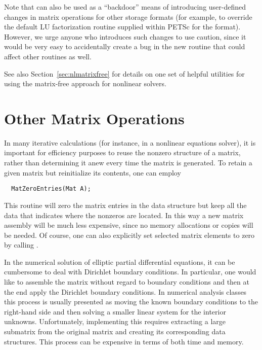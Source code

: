 Note that  can also be used as a
``backdoor'' means of introducing user-defined changes in matrix
operations for other storage formats (for example, to override the
default LU factorization routine supplied within PETSc for the
 format).  However, we urge anyone who introduces such
changes to use caution, since it would be very easy to
accidentally create a bug in the new routine that could affect
other routines as well.

See also Section~\ref{sec:nlmatrixfree} for details on one set of
helpful utilities for using the matrix-free approach for nonlinear
solvers.

\section{Other Matrix Operations}
\label{sec:othermat}

In many iterative calculations (for instance, in a nonlinear equations
solver), it is important for efficiency purposes to reuse the nonzero 
structure of a matrix, rather than determining it anew every time 
the matrix is generated.  To retain a given matrix but reinitialize
its contents, one can employ 
\begin{verbatim}
  MatZeroEntries(Mat A);
\end{verbatim}
This routine will zero the matrix entries in the 
data structure but keep all the data that indicates where the nonzeros
are located.  In this way a new matrix assembly will be much less 
expensive, since no memory allocations or copies will be needed. 
Of course, one can also explicitly set selected matrix elements to zero
by calling .


In the numerical solution of elliptic partial differential equations,
it can be cumbersome to deal with Dirichlet boundary 
 conditions. In
particular, one would like to assemble the matrix without regard to 
boundary conditions and then at the end apply the Dirichlet boundary 
conditions. 
In numerical analysis classes this process is usually presented as moving the 
known boundary conditions to the right-hand side and then solving a smaller
linear system for the interior unknowns. Unfortunately, implementing this
requires extracting a large submatrix from the original matrix and 
creating its corresponding data structures. This process can be expensive 
in terms of both time and memory. 


